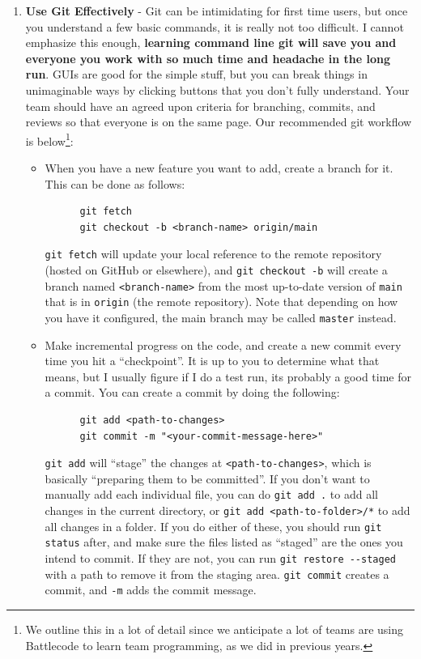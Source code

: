 \begin{enumerate}
  \item \textbf{Use Git Effectively} - Git can be intimidating for first time users, but once you understand a few basic commands, it is really not too difficult. I cannot emphasize this enough, \textbf{learning command line git will save you and everyone you work with so much time and headache in the long run}. GUIs are good for the simple stuff, but you can break things in unimaginable ways by clicking buttons that you don't fully understand. Your team should have an agreed upon criteria for branching, commits, and reviews so that everyone is on the same page. Our recommended git workflow is below\footnote{We outline this in a lot of detail since we anticipate a lot of teams are using Battlecode to learn team programming, as we did in previous years.}:
  \begin{itemize}
    \item When you have a new feature you want to add, create a branch for it. This can be done as follows:
    \begin{verbatim}
      git fetch
      git checkout -b <branch-name> origin/main \end{verbatim}
    \verb|git fetch| will update your local reference to the remote repository (hosted on GitHub or elsewhere), and \verb|git checkout -b| will create a branch named \verb|<branch-name>| from the most up-to-date version of \verb|main| that is in \verb|origin| (the remote repository). Note that depending on how you have it configured, the main branch may be called \verb|master| instead.
    \item Make incremental progress on the code, and create a new commit every time you hit a ``checkpoint''. It is up to you to determine what that means, but I usually figure if I do a test run, its probably a good time for a commit. You can create a commit by doing the following:
    \begin{verbatim}
      git add <path-to-changes>
      git commit -m "<your-commit-message-here>" \end{verbatim}
    \verb|git add| will ``stage'' the changes at \verb|<path-to-changes>|, which is basically ``preparing them to be committed''. If you don't want to manually add each individual file, you can do \verb|git add .| to add all changes in the current directory, or \verb|git add <path-to-folder>/*| to add all changes in a folder. If you do either of these, you should run \verb|git status| after, and make sure the files listed as ``staged'' are the ones you intend to commit. If they are not, you can run \verb|git restore --staged| with a path to remove it from the staging area. \verb|git commit| creates a commit, and \verb|-m| adds the commit message.

\end{itemize}
\end{enumerate}
